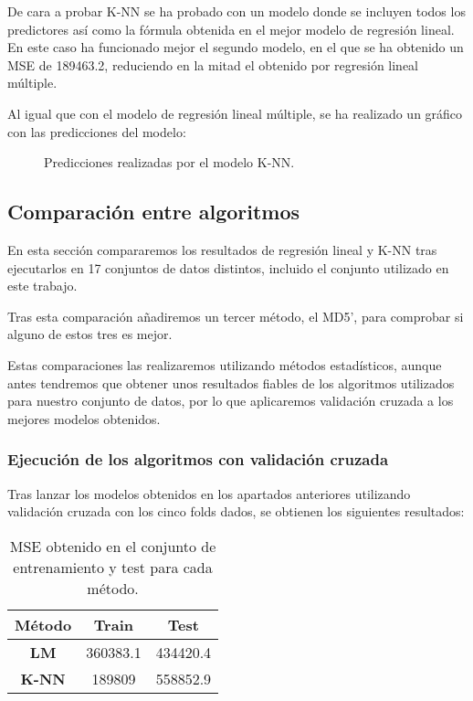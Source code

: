 De cara a probar K-NN se ha probado con un modelo donde se incluyen todos los predictores así como la fórmula obtenida en el mejor modelo de regresión lineal. En este caso ha funcionado mejor el segundo modelo, en el que se ha obtenido un MSE de 189463.2, reduciendo en la mitad el obtenido por regresión lineal múltiple.

Al igual que con el modelo de regresión lineal múltiple, se ha realizado un gráfico con las predicciones del modelo:

\begin{figure}[H]
	\centering
	
	\caption{Predicciones realizadas por el modelo K-NN.}
	\label{fig:predicciones_knn}
\end{figure}

\subsection{Comparación entre algoritmos}

En esta sección compararemos los resultados de regresión lineal y K-NN tras ejecutarlos en 17 conjuntos de datos distintos, incluido el conjunto utilizado en este trabajo.

Tras esta comparación añadiremos un tercer método, el MD5', para comprobar si alguno de estos tres es mejor.

Estas comparaciones las realizaremos utilizando métodos estadísticos, aunque antes tendremos que obtener unos resultados fiables de los algoritmos utilizados para nuestro conjunto de datos, por lo que aplicaremos validación cruzada a los mejores modelos obtenidos.

\subsubsection{Ejecución de los algoritmos con validación cruzada}

Tras lanzar los modelos obtenidos en los apartados anteriores utilizando validación cruzada con los cinco folds dados, se obtienen los siguientes resultados:

\begin{table}[H]
\centering
\begin{tabular}{|c|c|c|}
\hline
\textbf{Método} & \textbf{Train} & \textbf{Test} \\ \hline
\textbf{LM}     & 360383.1       & 434420.4      \\ \hline
\textbf{K-NN}   & 189809         & 558852.9      \\ \hline
\end{tabular}%
\caption{MSE obtenido en el conjunto de entrenamiento y test para cada método.}
\end{table}

